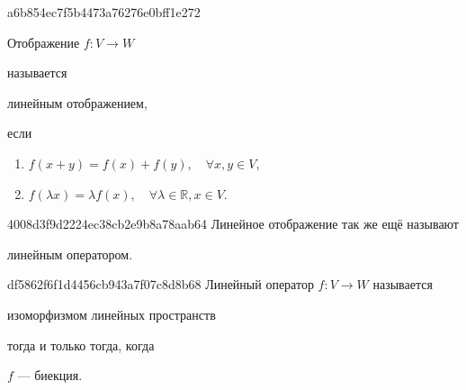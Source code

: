 
\begin{note}{a6b854ec7f5b4473a76276e0bff1e272}
    \begin{icloze}{3}Отображение \( f : V \to W \)\end{icloze} называется \begin{icloze}{2}линейным отображением,\end{icloze} если \begin{icloze}{1}
        \begin{enumerate}
            \item \( f(x + y) = f(x) + f(y), \quad \forall x, y \in V \),
            \item \( f(\lambda x) = \lambda f(x), \quad \forall \lambda \in \mathbb R, x \in V \).
        \end{enumerate}
    \end{icloze}
\end{note}

\begin{note}{4008d3f9d2224ec38cb2e9b8a78aab64}
    Линейное отображение так же ещё называют \begin{icloze}{1}линейным оператором.\end{icloze}
\end{note}

\begin{note}{df5862f6f1d4456cb943a7f07c8d8b68}
    Линейный оператор \( f : V \to W \) называется \begin{icloze}{1}и\-зо\-мор\-физм\-ом линейных пространств\end{icloze} тогда и только тогда, когда \begin{icloze}{2}\( f \) --- биекция.\end{icloze}
\end{note}


